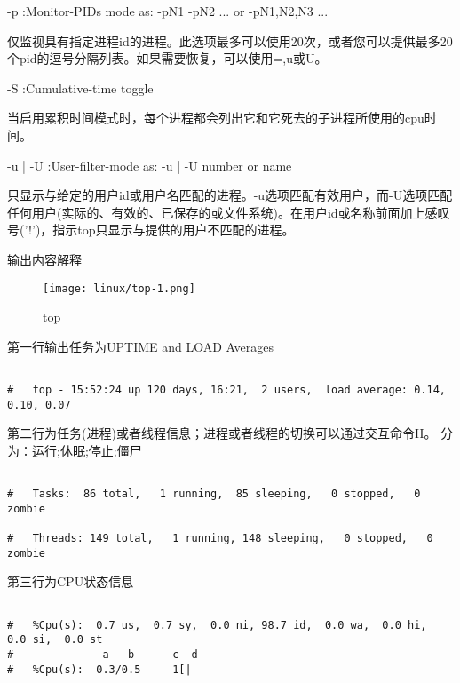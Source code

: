 -p  :Monitor-PIDs mode as:  -pN1 -pN2 ...  or  -pN1,N2,N3 ...\par
\qquad 仅监视具有指定进程id的进程。此选项最多可以使用20次，或者您可以提供最多20个pid的逗号分隔列表。如果需要恢复，可以使用=,u或U。

-S  :Cumulative-time toggle \par
\qquad 当启用累积时间模式时，每个进程都会列出它和它死去的子进程所使用的cpu时间。

-u | -U  :User-filter-mode as:  -u | -U number or name\par 
\qquad 只显示与给定的用户id或用户名匹配的进程。-u选项匹配有效用户，而-U选项匹配任何用户(实际的、有效的、已保存的或文件系统)。在用户id或名称前面加上感叹号('!')，指示top只显示与提供的用户不匹配的进程。


输出内容解释

\begin{figure}[H]
    \centering
    \texttt{[image: linux/top-1.png]}
    \caption{top}
\end{figure}



第一行输出任务为UPTIME and LOAD Averages

\begin{lstlisting}[language=cshell]

#   top - 15:52:24 up 120 days, 16:21,  2 users,  load average: 0.14, 0.10, 0.07

\end{lstlisting}

第二行为任务(进程)或者线程信息；进程或者线程的切换可以通过交互命令H。 分为：运行;休眠;停止;僵尸

\begin{lstlisting}[language=cshell]

#   Tasks:  86 total,   1 running,  85 sleeping,   0 stopped,   0 zombie

#   Threads: 149 total,   1 running, 148 sleeping,   0 stopped,   0 zombie

\end{lstlisting}


第三行为CPU状态信息


\begin{lstlisting}[language=cshell]

#   %Cpu(s):  0.7 us,  0.7 sy,  0.0 ni, 98.7 id,  0.0 wa,  0.0 hi,  0.0 si,  0.0 st
#              a   b      c  d 
#   %Cpu(s):  0.3/0.5     1[|

\end{lstlisting}

